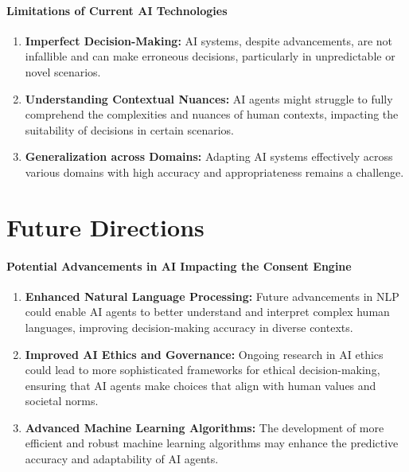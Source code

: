 \documentclass{article}
\begin{document}
\hypertarget{limitations-of-current-ai-technologies}{%
\paragraph{Limitations of Current AI
Technologies}\label{limitations-of-current-ai-technologies}}

\begin{enumerate}
\def\labelenumi{\arabic{enumi}.}
\item
  \textbf{Imperfect Decision-Making:} AI systems, despite advancements,
  are not infallible and can make erroneous decisions, particularly in
  unpredictable or novel scenarios\cite{steyversYear}.
\item
  \textbf{Understanding Contextual Nuances:} AI agents might struggle to
  fully comprehend the complexities and nuances of human contexts,
  impacting the suitability of decisions in certain
  scenarios\cite{steyversYear}.
\item
  \textbf{Generalization across Domains:} Adapting AI systems
  effectively across various domains with high accuracy and
  appropriateness remains a challenge\cite{steyversYear}.
\end{enumerate}

\hypertarget{future-directions}{%
\section*{Future Directions}\label{future-directions}}

\hypertarget{potential-advancements-in-ai-impacting-the-consent-engine}{%
\paragraph{Potential Advancements in AI Impacting the Consent
Engine}\label{potential-advancements-in-ai-impacting-the-consent-engine}}

\begin{enumerate}
\def\labelenumi{\arabic{enumi}.}
\item
  \textbf{Enhanced Natural Language Processing:} Future advancements in
  NLP could enable AI agents to better understand and interpret complex
  human languages, improving decision-making accuracy in diverse
  contexts.
\item
  \textbf{Improved AI Ethics and Governance:} Ongoing research in AI
  ethics could lead to more sophisticated frameworks for ethical
  decision-making, ensuring that AI agents make choices that align with
  human values and societal norms.
\item
  \textbf{Advanced Machine Learning Algorithms:} The development of more
  efficient and robust machine learning algorithms may enhance the
  predictive accuracy and adaptability of AI agents.
\end{enumerate}
\end{document}
